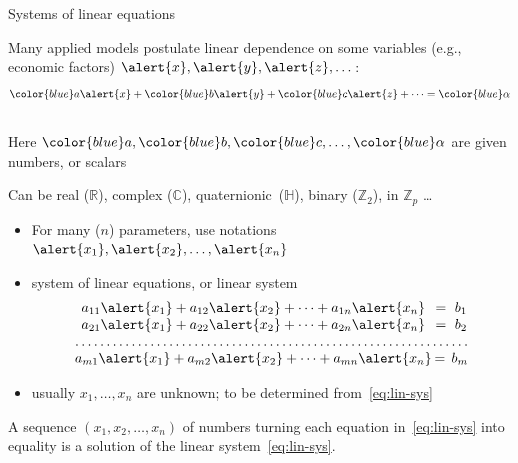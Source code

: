 \documentclass%
[handout]%
{beamer}
\newcommand\blue[1]{{\color{blue} #1}}
\begin{document}
\begin{frame}[label=linear]{Systems of linear equations}

\vspace*{-8pt}

\begin{block}{}
  Many applied models postulate linear dependence on some \alert{variables} (e.g., economic factors) $\alert{x},\alert{y},\alert{z},\dots$:\\[-15pt]
  \[
        \blue{a}\alert{x} + \blue{b} \alert{y} + \blue{c} \alert{z} + \dots = \blue{\alpha}
  \]\\[-5pt]
  Here $\blue{a}, \blue{b}, \blue{c}, \dots, \blue{\alpha}$ are given \blue{numbers}, or \blue{scalars}%
  \begin{footnote}
     {Can be real ($\mathbb{R}$), complex ($\mathbb{C}$), quaternionic~($\mathbb{H}$), binary ($\mathbb{Z}_2$), in  $\mathbb{Z}_p$ \dots}
   \end{footnote}
\end{block}

\vspace{-6pt}

\begin{itemize}
  \item For many ($n$) parameters, use notations~$\alert{x_1},\alert{x_2},\dots,\alert{x_n}$
  \item %
      \alert{system of linear equations}, or \alert{linear system} \\[-10pt]
\begin{equation}\label{eq:lin-sys} \begin{matrix}
    a_{11}\alert{x_1} + a_{12}\alert{x_2} + \cdots + a_{1n} \alert{x_n} \hspace{-8pt}&= \ b_1\\
    a_{21}\alert{x_1} + a_{22}\alert{x_2} + \cdots + a_{2n} \alert{x_n} \hspace{-8pt}&= \ b_2\\
    \hdotsfor{2} \\
    a_{m1}\alert{x_1} + a_{m2}\alert{x_2} + \cdots + a_{mn} \alert{x_n} \hspace{-8pt}&= \,b_m
   \end{matrix}
\end{equation}
\item usually $x_1,\dots,x_n$ are \alert{unknown}; to be determined from~\eqref{eq:lin-sys}
\end{itemize}

\vspace*{-8pt}

\begin{definition}
A sequence $(x_1,x_2,\dots,x_n)$ of numbers turning each equation in~\eqref{eq:lin-sys} into equality is a \alert{solution} of the linear system~\eqref{eq:lin-sys}.
\end{definition}


\end{frame}
\end{document}
